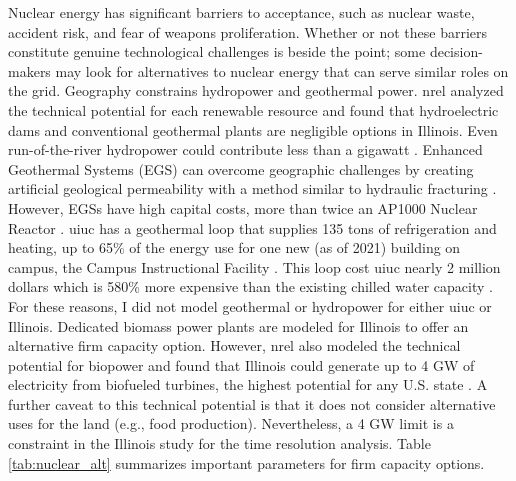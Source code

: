 Nuclear energy has significant barriers to acceptance, such as nuclear waste,
accident risk, and fear of weapons proliferation. Whether or not these barriers
constitute genuine technological challenges is beside the point; some decision-makers
may look for alternatives to nuclear energy that can serve similar roles
on the grid. Geography constrains hydropower and geothermal power. \gls{nrel} analyzed
the technical potential for each renewable resource and found that hydroelectric dams
and conventional geothermal plants are negligible options in Illinois. Even run-of-the-river
hydropower could contribute less than a gigawatt \cite{lopez_us_2012}. Enhanced Geothermal
Systems (EGS) can overcome geographic challenges by creating artificial geological permeability
with a method similar to hydraulic fracturing \cite{geothermal_technologies_office_what_2012}.
However, EGSs have high capital costs, more than twice an AP1000 Nuclear Reactor
\cite{nrel_2020_2020}. \gls{uiuc} has a geothermal loop that supplies 135 tons of refrigeration
and heating, up to 65\% of the energy use for one new (as of 2021) building on campus,
the Campus Instructional Facility \cite{noauthor_geothermal_nodate}.
This loop cost \gls{uiuc} nearly 2 million dollars which is 580\% more expensive
than the existing chilled water capacity
\cite{noauthor_geothermal_nodate,affiliated_engineers_inc_utilities_2015}. For these
reasons, I did not model geothermal or hydropower for either \gls{uiuc} or Illinois.
Dedicated biomass power plants are modeled for Illinois to offer an alternative
firm capacity option. However, \gls{nrel} also modeled the technical potential for biopower
and found that Illinois could generate up to 4 GW of electricity from biofueled turbines, the highest potential
for any U.S. state \cite{lopez_us_2012}. A further caveat to this technical potential is that it does not
consider alternative uses for the land (e.g., food production). Nevertheless, a 4 GW limit is a constraint in the Illinois study for the time resolution analysis.
Table \ref{tab:nuclear_alt} summarizes important parameters for firm capacity options.

